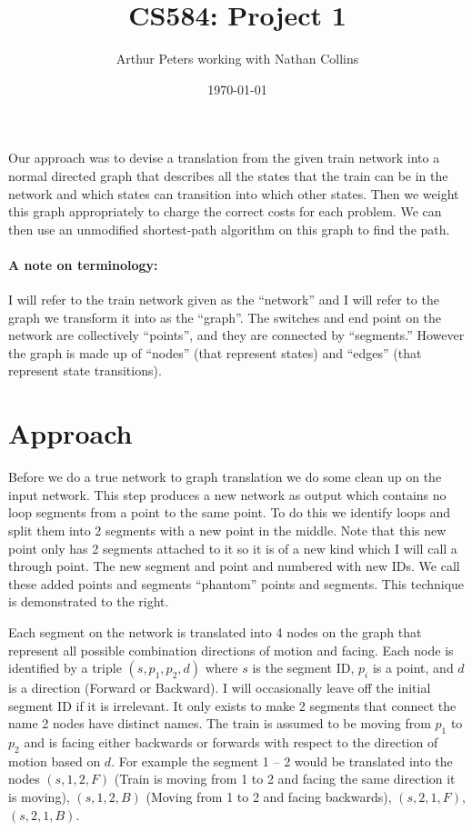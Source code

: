 \documentclass[11pt]{article}
\author{Arthur Peters working with Nathan Collins}
\title{CS584: Project 1}
\date{\today}
\newcommand{\<}{\langle}
\renewcommand{\>}{\rangle}
\begin{document}
\maketitle

Our approach was to devise a translation from the given train network into a normal directed graph that describes all the states that the train can be in the network and which states can transition into which other states. Then we weight this graph appropriately to charge the correct costs for each problem. We can then use an unmodified shortest-path algorithm on this graph to find the path. 

\paragraph{A note on terminology:} I will refer to the train network given as the ``network'' and I will refer to the graph we transform it into as the ``graph''. The switches and end point on the network are collectively ``points'', and they are connected by ``segments.'' However the graph is made up of ``nodes'' (that represent states) and ``edges'' (that represent state transitions).

\section{Approach}

Before we do a true network to graph translation we do some clean up on the input network. This step produces a new network as output which contains no loop segments from a point to the same point. To do this we identify loops and split them into 2 segments with a new point in the middle. Note that this new point only has 2 segments attached to it so it is of a new kind which I will call a through point. The new segment and point and numbered with new IDs. We call these added points and segments ``phantom'' points and segments. This technique is demonstrated to the right.

Each segment on the network is translated into 4 nodes on the graph that represent all possible combination directions of motion and facing. Each node is identified by a triple $(s, p_1, p_2, d)$ where $s$ is the segment ID, $p_i$ is a point, and $d$ is a direction (Forward or Backward). I will occasionally leave off the initial segment ID if it is irrelevant. It only exists to make 2 segments that connect the name 2 nodes have distinct names. The train is assumed to be moving from $p_1$ to $p_2$ and is facing either backwards or forwards with respect to the direction of motion based on $d$. For example the segment 1 -- 2 would be translated into the nodes $(s, 1, 2, F)$ (Train is moving from 1 to 2 and facing the same direction it is moving), $(s, 1, 2, B)$ (Moving from 1 to 2 and facing backwards), $(s, 2, 1, F)$, $(s, 2, 1, B)$. 
\end{document}
